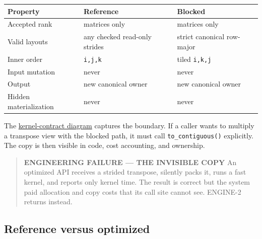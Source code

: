 \documentclass[
  10pt,
]{article}
\newcounter{none} %
\begin{document}
{\def\LTcaptype{none} %
\begin{longtable}[]{@{}
  >{\raggedright\arraybackslash}p{}
  >{\raggedright\arraybackslash}p{}
  >{\raggedright\arraybackslash}p{}@{}}
\toprule\noalign{}
\begin{minipage}[b]{\linewidth}\raggedright
Property
\end{minipage} & \begin{minipage}[b]{\linewidth}\raggedright
Reference
\end{minipage} & \begin{minipage}[b]{\linewidth}\raggedright
Blocked
\end{minipage} \\
\midrule\noalign{}
\endhead
\bottomrule\noalign{}
\endlastfoot
Accepted rank & matrices only & matrices only \\
Valid layouts & any checked read-only strides & strict canonical
row-major \\
Inner order & \texttt{i,j,k} & tiled \texttt{i,k,j} \\
Input mutation & never & never \\
Output & new canonical owner & new canonical owner \\
Hidden materialization & never & never \\
\end{longtable}
}

The
\href{https://github.com/hermonai/inside-the-llm-engine/blob/astra-visual-rewrite/diagrams/linear/reference-vs-blocked-kernel.txt}{kernel-contract
diagram} captures the boundary. If a caller wants to multiply a
transpose view with the blocked path, it must call
\texttt{to\_contiguous()} explicitly. The copy is then visible in code,
cost accounting, and ownership.

\begin{quote}
\textbf{ENGINEERING FAILURE --- THE INVISIBLE COPY} An optimized API
receives a strided transpose, silently packs it, runs a fast kernel, and
reports only kernel time. The result is correct but the system paid
allocation and copy costs that its call site cannot see. ENGINE-2
returns \texttt{} instead.
\end{quote}

\subsection{Reference versus
optimized}\label{reference-versus-optimized}
\end{document}
